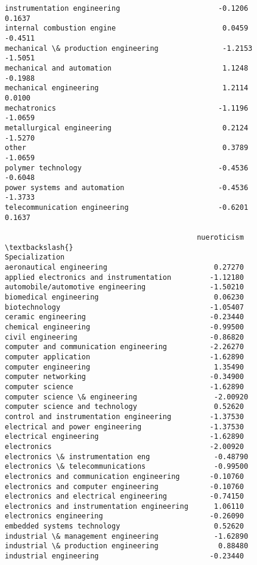 \documentclass[11pt]{article}
\begin{document}
\begin{tcolorbox}[breakable, size=fbox, boxrule=.5pt, pad at break*=1mm, opacityfill=0]
\begin{Verbatim}[commandchars=\\\{\}]
instrumentation engineering                       -0.1206        0.1637
internal combustion engine                         0.0459       -0.4511
mechanical \& production engineering               -1.2153       -1.5051
mechanical and automation                          1.1248       -0.1988
mechanical engineering                             1.2114        0.0100
mechatronics                                      -1.1196       -1.0659
metallurgical engineering                          0.2124       -1.5270
other                                              0.3789       -1.0659
polymer technology                                -0.4536       -0.6048
power systems and automation                      -0.4536       -1.3733
telecommunication engineering                     -0.6201        0.1637

                                             nueroticism  \textbackslash{}
Specialization
aeronautical engineering                         0.27270
applied electronics and instrumentation         -1.12180
automobile/automotive engineering               -1.50210
biomedical engineering                           0.06230
biotechnology                                   -1.05407
ceramic engineering                             -0.23440
chemical engineering                            -0.99500
civil engineering                               -0.86820
computer and communication engineering          -2.26270
computer application                            -1.62890
computer engineering                             1.35490
computer networking                             -0.34900
computer science                                -1.62890
computer science \& engineering                  -2.00920
computer science and technology                  0.52620
control and instrumentation engineering         -1.37530
electrical and power engineering                -1.37530
electrical engineering                          -1.62890
electronics                                     -2.00920
electronics \& instrumentation eng               -0.48790
electronics \& telecommunications                -0.99500
electronics and communication engineering       -0.10760
electronics and computer engineering            -0.10760
electronics and electrical engineering          -0.74150
electronics and instrumentation engineering      1.06110
electronics engineering                         -0.26090
embedded systems technology                      0.52620
industrial \& management engineering             -1.62890
industrial \& production engineering              0.88480
industrial engineering                          -0.23440

\end{Verbatim}
\end{tcolorbox}
\end{document}
